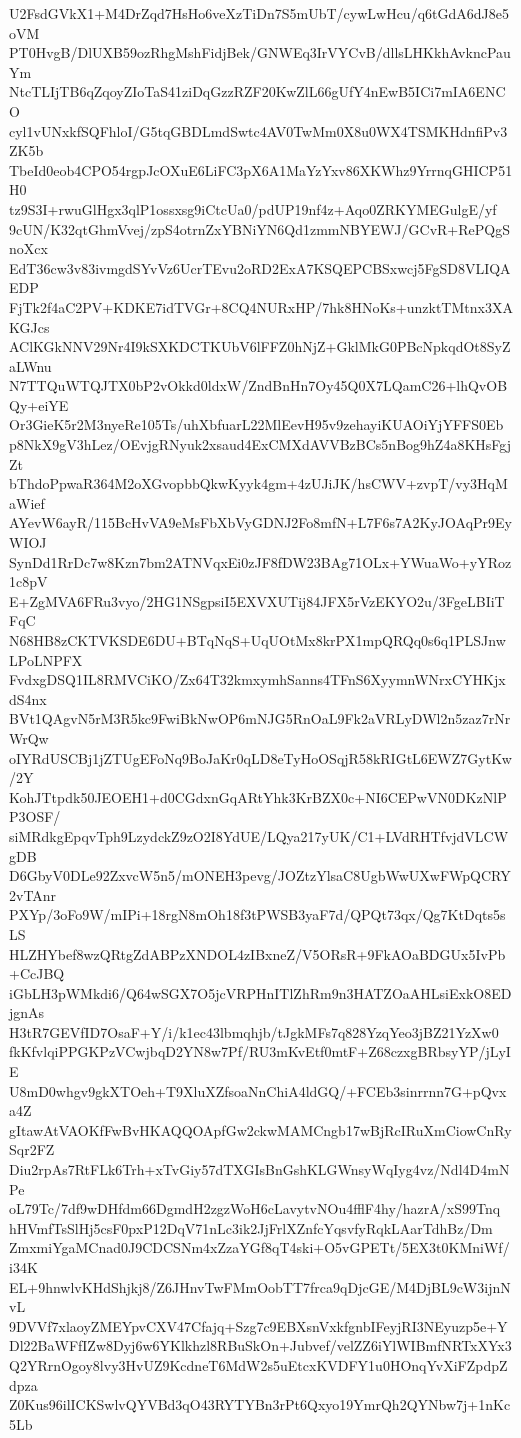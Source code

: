 U2FsdGVkX1+M4DrZqd7HsHo6veXzTiDn7S5mUbT/cywLwHcu/q6tGdA6dJ8e5oVM
PT0HvgB/DlUXB59ozRhgMshFidjBek/GNWEq3IrVYCvB/dllsLHKkhAvkncPauYm
NtcTLIjTB6qZqoyZIoTaS41ziDqGzzRZF20KwZlL66gUfY4nEwB5ICi7mIA6ENCO
cyl1vUNxkfSQFhloI/G5tqGBDLmdSwtc4AV0TwMm0X8u0WX4TSMKHdnfiPv3ZK5b
TbeId0eob4CPO54rgpJcOXuE6LiFC3pX6A1MaYzYxv86XKWhz9YrrnqGHICP51H0
tz9S3I+rwuGlHgx3qlP1ossxsg9iCtcUa0/pdUP19nf4z+Aqo0ZRKYMEGulgE/yf
9cUN/K32qtGhmVvej/zpS4otrnZxYBNiYN6Qd1zmmNBYEWJ/GCvR+RePQgSnoXcx
EdT36cw3v83ivmgdSYvVz6UcrTEvu2oRD2ExA7KSQEPCBSxwcj5FgSD8VLIQAEDP
FjTk2f4aC2PV+KDKE7idTVGr+8CQ4NURxHP/7hk8HNoKs+unzktTMtnx3XAKGJcs
AClKGkNNV29Nr4I9kSXKDCTKUbV6lFFZ0hNjZ+GklMkG0PBcNpkqdOt8SyZaLWnu
N7TTQuWTQJTX0bP2vOkkd0ldxW/ZndBnHn7Oy45Q0X7LQamC26+lhQvOBQy+eiYE
Or3GieK5r2M3nyeRe105Ts/uhXbfuarL22MlEevH95v9zehayiKUAOiYjYFFS0Eb
p8NkX9gV3hLez/OEvjgRNyuk2xsaud4ExCMXdAVVBzBCs5nBog9hZ4a8KHsFgjZt
bThdoPpwaR364M2oXGvopbbQkwKyyk4gm+4zUJiJK/hsCWV+zvpT/vy3HqMaWief
AYevW6ayR/115BcHvVA9eMsFbXbVyGDNJ2Fo8mfN+L7F6s7A2KyJOAqPr9EyWIOJ
SynDd1RrDc7w8Kzn7bm2ATNVqxEi0zJF8fDW23BAg71OLx+YWuaWo+yYRoz1c8pV
E+ZgMVA6FRu3vyo/2HG1NSgpsiI5EXVXUTij84JFX5rVzEKYO2u/3FgeLBIiTFqC
N68HB8zCKTVKSDE6DU+BTqNqS+UqUOtMx8krPX1mpQRQq0s6q1PLSJnwLPoLNPFX
FvdxgDSQ1IL8RMVCiKO/Zx64T32kmxymhSanns4TFnS6XyymnWNrxCYHKjxdS4nx
BVt1QAgvN5rM3R5kc9FwiBkNwOP6mNJG5RnOaL9Fk2aVRLyDWl2n5zaz7rNrWrQw
oIYRdUSCBj1jZTUgEFoNq9BoJaKr0qLD8eTyHoOSqjR58kRIGtL6EWZ7GytKw/2Y
KohJTtpdk50JEOEH1+d0CGdxnGqARtYhk3KrBZX0c+NI6CEPwVN0DKzNlPP3OSF/
siMRdkgEpqvTph9LzydckZ9zO2I8YdUE/LQya217yUK/C1+LVdRHTfvjdVLCWgDB
D6GbyV0DLe92ZxvcW5n5/mONEH3pevg/JOZtzYlsaC8UgbWwUXwFWpQCRY2vTAnr
PXYp/3oFo9W/mIPi+18rgN8mOh18f3tPWSB3yaF7d/QPQt73qx/Qg7KtDqts5sLS
HLZHYbef8wzQRtgZdABPzXNDOL4zIBxneZ/V5ORsR+9FkAOaBDGUx5IvPb+CcJBQ
iGbLH3pWMkdi6/Q64wSGX7O5jcVRPHnITlZhRm9n3HATZOaAHLsiExkO8EDjgnAs
H3tR7GEVfID7OsaF+Y/i/k1ec43lbmqhjb/tJgkMFs7q828YzqYeo3jBZ21YzXw0
fkKfvlqiPPGKPzVCwjbqD2YN8w7Pf/RU3mKvEtf0mtF+Z68czxgBRbsyYP/jLyIE
U8mD0whgv9gkXTOeh+T9XluXZfsoaNnChiA4ldGQ/+FCEb3sinrrnn7G+pQvxa4Z
gItawAtVAOKfFwBvHKAQQOApfGw2ckwMAMCngb17wBjRcIRuXmCiowCnRySqr2FZ
Diu2rpAs7RtFLk6Trh+xTvGiy57dTXGIsBnGshKLGWnsyWqIyg4vz/Ndl4D4mNPe
oL79Tc/7df9wDHfdm66DgmdH2zgzWoH6cLavytvNOu4fflF4hy/hazrA/xS99Tnq
hHVmfTsSlHj5csF0pxP12DqV71nLc3ik2JjFrlXZnfcYqsvfyRqkLAarTdhBz/Dm
ZmxmiYgaMCnad0J9CDCSNm4xZzaYGf8qT4ski+O5vGPETt/5EX3t0KMniWf/i34K
EL+9hnwlvKHdShjkj8/Z6JHnvTwFMmOobTT7frca9qDjcGE/M4DjBL9cW3ijnNvL
9DVVf7xlaoyZMEYpvCXV47Cfajq+Szg7c9EBXsnVxkfgnbIFeyjRI3NEyuzp5e+Y
Dl22BaWFfIZw8Dyj6w6YKlkhzl8RBuSkOn+Jubvef/velZZ6iYlWIBmfNRTxXYx3
Q2YRrnOgoy8lvy3HvUZ9KcdneT6MdW2s5uEtcxKVDFY1u0HOnqYvXiFZpdpZdpza
Z0Kus96ilICKSwlvQYVBd3qO43RYTYBn3rPt6Qxyo19YmrQh2QYNbw7j+1nKc5Lb
